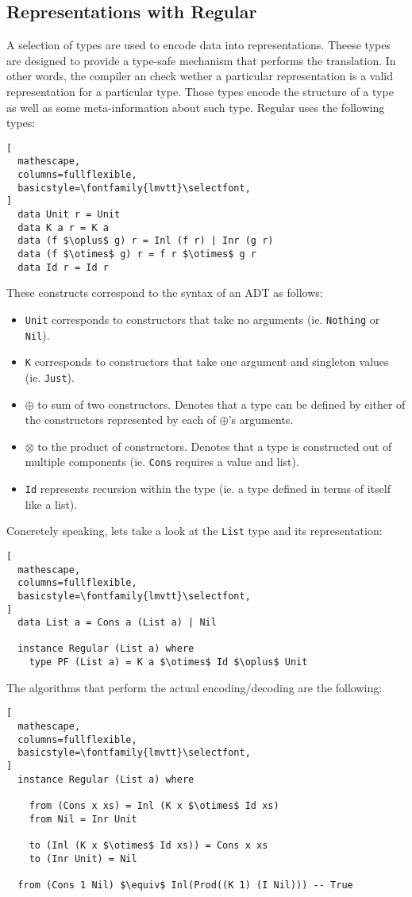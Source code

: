 \documentclass[8pt]{extarticle}
\begin{document}
\subsection{Representations with Regular}
A selection of types are used to encode data into representations. Theese types are designed to provide a type-safe mechanism that performs the translation. In other words, the compiler an check wether a particular representation is a valid representation for a particular type. Those types encode the structure of a type as well as some meta-information about such type. Regular uses the following types:
\begin{lstlisting}[
  mathescape,
  columns=fullflexible,
  basicstyle=\fontfamily{lmvtt}\selectfont,
]
  data Unit r = Unit
  data K a r = K a
  data (f $\oplus$ g) r = Inl (f r) | Inr (g r)
  data (f $\otimes$ g) r = f r $\otimes$ g r
  data Id r = Id r
\end{lstlisting}
These constructs correspond to the syntax of an ADT as follows:
\begin{itemize}
\item \verb+Unit+ corresponds to constructors that take no arguments (ie. \verb+Nothing+ or \verb+Nil+).
\item \verb+K+ corresponds to constructors that take one argument and singleton values (ie. \verb+Just+).
\item $\oplus$ to sum of two constructors. Denotes that a type can be defined by either of the constructors represented by each of $\oplus$'s arguments.
\item $\otimes$ to the product of constructors. Denotes that a type is constructed out of multiple components (ie. \verb+Cons+ requires a value and list).
\item \verb+Id+ represents recursion within the type (ie. a type defined in terms of itself like a list).
\end{itemize}
Concretely speaking, lets take a look at the \verb+List+ type and its representation:
\begin{lstlisting}[
  mathescape,
  columns=fullflexible,
  basicstyle=\fontfamily{lmvtt}\selectfont,
]
  data List a = Cons a (List a) | Nil

  instance Regular (List a) where
    type PF (List a) = K a $\otimes$ Id $\oplus$ Unit
\end{lstlisting}
The algorithms that perform the actual encoding/decoding are the following:
\begin{lstlisting}[
  mathescape,
  columns=fullflexible,
  basicstyle=\fontfamily{lmvtt}\selectfont,
]
  instance Regular (List a) where

    from (Cons x xs) = Inl (K x $\otimes$ Id xs)
    from Nil = Inr Unit
    
    to (Inl (K x $\otimes$ Id xs)) = Cons x xs
    to (Inr Unit) = Nil

  from (Cons 1 Nil) $\equiv$ Inl(Prod((K 1) (I Nil))) -- True
\end{lstlisting}
\end{document}
